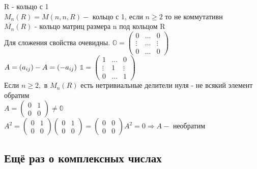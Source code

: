 \begin{theorem}
	R - кольцо с 1\\
	$ M_n (R) = M(n,n,R) - $ кольцо с 1, если $ n \geq 2 $ то не коммутативн\\
	$ \overline{M_n} (R)  $ - кольцо матриц размера n под кольцом R \\
	Для сложения свойства очевидны. 
	$ \mathds{O} = \begin{pmatrix}
		0 & ... & 0 \\
		\vdots & ... & \vdots \\
		0 & ... & 0
	\end{pmatrix} $\\
	 $ A = (a_{ij}) \\
	 -A = (-a_{ij}) $
	 $ \mathds{1} = \begin{pmatrix}
	 1 & ... & 0 \\
	 \vdots & 1 & \vdots \\
	 0 & ... & 1
	 \end{pmatrix} $\\
	 Если $ n \geq 2, $  в $ M_n(R) $ есть нетривиальные делители нуля - не всякий элемент обратим \\
	 $ A = \begin{pmatrix}
	 	0 & 1\\
	 	0 & 0 
	 \end{pmatrix} \neq \mathds{0} $ \\
	 $ A^2 = \begin{pmatrix}
	 0 & 1\\
	 0 & 0 
	 \end{pmatrix} \begin{pmatrix}
	 0 & 1\\
	 0 & 0 
	 \end{pmatrix} = \begin{pmatrix}
	 0 & 0\\
	 0 & 0 
	 \end{pmatrix} 
	 A^2 = 0 \Rightarrow A - $ необратим
 \end{theorem}

\subsection{Ещё раз о комплексных числах}


